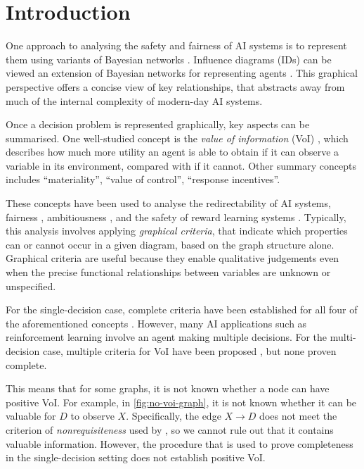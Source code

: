 \section{Introduction}

One approach to analysing the safety and fairness of AI systems is to represent them using variants of Bayesian networks \citep{Everitt2019modeling, Kusner2017}.
Influence diagrams (IDs) can be viewed an extension of Bayesian networks for representing agents \citep{Howard2005,Everitt2021agent}.
This graphical perspective offers a concise view of key relationships, that abstracts away from much of the internal complexity of modern-day AI systems.


Once a decision problem is represented graphically, key aspects can be summarised.
One well-studied concept is the \emph{value of information} (VoI) \citep{Howard1966}, which describes how much more utility 
an agent is able to obtain if it can observe a variable in its environment, compared with if it cannot.
Other summary concepts includes ``materiality'', ``value of control'', 
``response incentives''.~


These concepts have been used to analyse the
redirectability \citep{everitt2019tampering,Holtman2020} of AI systems,
fairness \citep{Everitt2021agent,Ashurst2022}, 
ambitiousness \citep{cohen2020unambitious},
and %
the safety of reward learning systems
\citep{Armstrong2020pitfalls,Everitt2019modeling,langlois2021rl,Evans2021,Farquhar2022}.
Typically, this analysis involves applying \emph{graphical criteria}, that indicate which properties can or
cannot occur in a given diagram, based on the graph structure alone.
Graphical criteria are useful because they
enable qualitative judgements 
even when the precise functional relationships between variables
are unknown or unspecified.
~

For the single-decision case, complete criteria have been established for all four of the aforementioned concepts \citep{Everitt2021agent}.
However, many AI applications such as reinforcement learning involve an agent making multiple decisions.
For the multi-decision case, multiple criteria for VoI have been proposed
\citep{Nielsen1999,Shachter1998,nilsson2000evaluating},
but none proven complete.



This means that for some graphs, it is not known whether a node can have positive VoI.
For example, in \cref{fig:no-voi-graph}, it is not known whether it can be valuable for $D$
to observe $X$.
Specifically, the edge $X \to D$ does not meet the criterion of \emph{nonrequisiteness} used by \citet{nilsson2000evaluating}, 
so we cannot rule out that it contains valuable information.
However, the procedure that is used to prove completeness in the single-decision setting \citep{Everitt2021agent} does not establish positive VoI.


